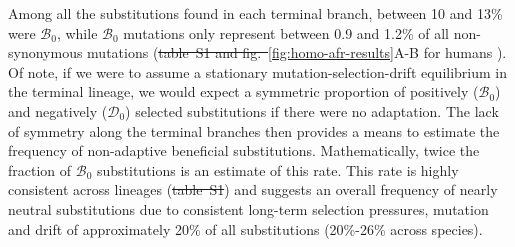\documentclass[10pt,letterpaper]{article}
\newcommand{\SphyDel}{\mathcal{D}_0}
\newcommand{\SphyBen}{\mathcal{B}_0}
\providecommand{\DIFaddtex}[1]{{\protect\color{blue}\uwave{#1}}} %
\providecommand{\DIFdeltex}[1]{{\protect\color{red}\sout{#1}}}                      %
\providecommand{\DIFaddbegin}{} %
\providecommand{\DIFaddend}{} %
\providecommand{\DIFdelbegin}{} %
\providecommand{\DIFdelend}{} %
\providecommand{\DIFadd}[1]{\texorpdfstring{\DIFaddtex{#1}}{#1}} %
\providecommand{\DIFdel}[1]{\texorpdfstring{\DIFdeltex{#1}}{}} %
\newcommand{\DIFscaledelfig}{0.5}
\newlength{\DIFdelgraphicswidth} %
\newlength{\DIFdelgraphicsheight} %
\newcommand{\DIFaddincludegraphics}[2][]{{\color{blue}\fbox{\DIFOincludegraphics[#1]{#2}}}} %
\newcommand{\DIFdelincludegraphics}[2][]{%
\sbox{\DIFdelgraphicsbox}{\DIFOincludegraphics[#1]{#2}}%
\settoboxwidth{\DIFdelgraphicswidth}{\DIFdelgraphicsbox} %
\settoboxtotalheight{\DIFdelgraphicsheight}{\DIFdelgraphicsbox} %
\scalebox{\DIFscaledelfig}{%
\parbox[b]{\DIFdelgraphicswidth}{\usebox{\DIFdelgraphicsbox}\\[-\baselineskip] \rule{\DIFdelgraphicswidth}{0em}}\llap{\resizebox{\DIFdelgraphicswidth}{\DIFdelgraphicsheight}{%
\setlength{\unitlength}{\DIFdelgraphicswidth}%
\begin{picture}(1,1)%
\thicklines\linethickness{2pt} %
{\color[rgb]{1,0,0}\put(0,0){\framebox(1,1){}}}%
{\color[rgb]{1,0,0}\put(0,0){\line( 1,1){1}}}%
{\color[rgb]{1,0,0}\put(0,1){\line(1,-1){1}}}%
\end{picture}%
}\hspace*{3pt}}} %
} %
\DeclareRobustCommand{\DIFaddbegin}{\DIFOaddbegin \let\includegraphics\DIFaddincludegraphics} %
\DeclareRobustCommand{\DIFaddend}{\DIFOaddend \let\includegraphics\DIFOincludegraphics} %
\DeclareRobustCommand{\DIFdelbegin}{\DIFOdelbegin \let\includegraphics\DIFdelincludegraphics} %
\DeclareRobustCommand{\DIFdelend}{\DIFOaddend \let\includegraphics\DIFOincludegraphics} %
\begin{document}
Among all the substitutions found in each terminal branch, between 10 and 13\% were $\SphyBen$, while $\SphyBen$ mutations only represent between 0.9 and 1.2\% of all non-synonymous mutations (\DIFdelbegin \DIFdel{table~S1 and fig.~}\DIFdelend \DIFaddbegin \DIFadd{Fig~}\DIFaddend \ref{fig:homo-afr-results}A-B for humans \DIFaddbegin \DIFadd{and ~} \DIFadd{for all dataset}\DIFaddend ).
Of note, if we were to assume a stationary mutation-selection-drift equilibrium in the terminal lineage, we would expect a symmetric proportion of positively ($\SphyBen$) and negatively ($\SphyDel$) selected substitutions if there were no adaptation.
The lack of symmetry along the terminal branches then provides a means to estimate the frequency of non-adaptive beneficial substitutions.
Mathematically, twice the fraction of $\SphyBen$ substitutions is an estimate of this rate.
This rate is highly consistent across lineages (\DIFdelbegin \DIFdel{table~S1}\DIFdelend \DIFaddbegin {}\DIFaddend ) and suggests an overall frequency of nearly neutral substitutions due to consistent long-term selection pressures, mutation and drift of approximately 20\% of all substitutions (20\%-26\% across species).
\end{document}
